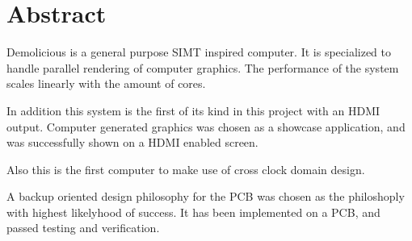 \documentclass[../main/report.tex]{subfiles}
\begin{document}
\vspace*{\fill}
\chapter*{Abstract}
\label{sec:abstract}

Demolicious is a general purpose SIMT inspired computer.
It is specialized to handle parallel rendering of computer graphics.
The performance of the system scales linearly with the amount of cores.

In addition this system is the first of its kind in this project with an HDMI output.
Computer generated graphics was chosen as a showcase application, and was successfully shown on a HDMI enabled screen.

Also this is the first computer to make use of cross clock domain design.

A backup oriented design philosophy for the PCB was chosen as the philoshoply with highest likelyhood of success.
It has been implemented on a PCB, and passed testing and verification.

\vspace*{\fill}
\end{document}
